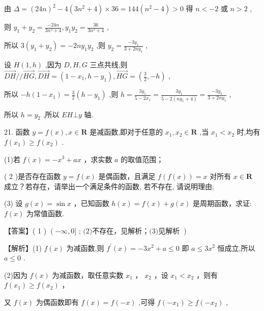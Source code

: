 \documentclass[10pt]{article}
\begin{document}
由 \(\Delta  = {\left( {24}n\right) }^{2} - 4\left( {3{n}^{2} + 4}\right)  \times  {36} = {144}\left( {{n}^{2} - 4}\right)  > 0\) 得 \(n <  - 2\) 或 \(n > 2\) ,

则 \({y}_{1} + {y}_{2} = \frac{-{24n}}{3{n}^{2} + 4},{y}_{1}{y}_{2} = \frac{36}{3{n}^{2} + 4}\) ,

所以 \(3\left( {{y}_{1} + {y}_{2}}\right)  =  - {2n}{y}_{1}{y}_{2}\) ,则 \({y}_{2} = \frac{-3{y}_{1}}{3 + {2n}{y}_{1}}\) ,

设 \(H\left( {1,h}\right)\) ,因为 \(D,H,G\) 三点共线,则 \(\overrightarrow{DH}//\overrightarrow{HG},\overrightarrow{DH} = \left( {1 - {x}_{1},h - {y}_{1}}\right) ,\overrightarrow{HG} = \left( {\frac{3}{2}, - h}\right)\) ,

所以 \(- h\left( {1 - {x}_{1}}\right)  = \frac{3}{2}\left( {h - {y}_{1}}\right)\) ,则 \(h = \frac{3{y}_{1}}{5 - 2{x}_{1}} = \frac{3{y}_{1}}{5 - 2\left( {n{y}_{1} + 4}\right) } = \frac{-3{y}_{1}}{3 + {2n}{y}_{1}}\) ,

所以 \(h = {y}_{2}\) ,所以 \({EH} \bot  y\) 轴.

21. 函数 \(y = f\left( x\right) ,x \in  \mathbf{R}\) 是减函数,即对于任意的 \({x}_{1},{x}_{2} \in  \mathbf{R}\) ,当 \({x}_{1} < {x}_{2}\) 时,均有 \(f\left( {x}_{1}\right)  \geq  f\left( {x}_{2}\right)\) .

(1)若 \(f\left( x\right)  =  - {x}^{3} + {ax}\) ，求实数 \(a\) 的取值范围；

( 2 )是否存在函数 \(y = f\left( x\right)\) 是偶函数，且满足 \(f\left( {f\left( x\right) }\right)  = x\) 对所有 \(x \in  \mathbf{R}\) 成立？若存在，请举出一个满足条件的函数, 若不存在, 请说明理由;

(3) 设 \(g\left( x\right)  = \sin x\) ，已知函数 \(h\left( x\right)  = f\left( x\right)  + g\left( x\right)\) 是周期函数，求证: \(f\left( x\right)\) 为常值函数.

【答案】( 1 ) \(\left( {-\infty ,0\rbrack \text{ ; (2)不存在，见解析；(3)见解析 }}\right)\)

【解析】(1) \(f\left( x\right)\) 为减函数,则 \({f}^{\prime }\left( x\right)  =  - 3{x}^{2} + a \leq  0\) 即 \(a \leq  3{x}^{2}\) 恒成立,所以 \(a \leq  0\) .

(2)因为 \(f\left( x\right)\) 为减函数，取任意实数 \({x}_{1}\) ， \({x}_{2}\) ，设 \({x}_{1} < {x}_{2}\) ，则有 \(f\left( {x}_{1}\right)  \geq  f\left( {x}_{2}\right)\) ，

又 \(f\left( x\right)\) 为偶函数即有 \(f\left( x\right)  = f\left( {-x}\right)\) ,可得 \(f\left( {-{x}_{1}}\right)  \geq  f\left( {-{x}_{2}}\right)\) ,
\end{document}
